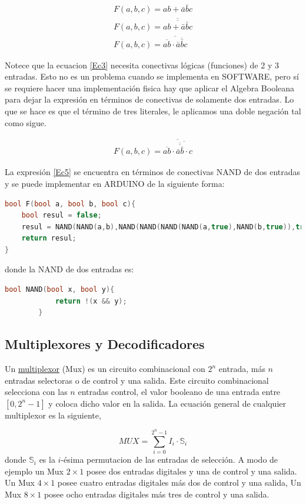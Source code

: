 \begin{eqnarray}
\label{Ec2}
F(a,b,c)=ab+\bar{a}\bar{b}c \\
F(a,b,c)=\overline{\overline{ab+\bar{a}\bar{b}c }} \\  \label{Ec3}
F(a,b,c)=\overline{\overline{ab}\cdot\overline{\bar{a}\bar{b}c}}
\end{eqnarray}


Notece que la ecuacion \eqref{Ec3} necesita conectivas lógicas (funciones) de 2 y 3 entradas. Esto no es un problema cuando se implementa en SOFTWARE, pero sí se requiere hacer una implementación fisica hay que aplicar el Algebra Booleana para dejar la expresión en términos de conectivas de solamente dos entradas. Lo que se hace es que el término de tres literales, le aplicamos una doble negación tal como sigue.

\begin{eqnarray}
\label{Ec5}
F(a,b,c)=\overline{\overline{ab}\cdot\overline{\overline{\overline{\bar{a}\bar{b}}}\cdot c}} 
\end{eqnarray}

La expresión \eqref{Ec5} se encuentra en términos de conectivas NAND de dos entradas y se puede implementar en ARDUINO  de la siguiente forma:
{\footnotesize 
\begin{lstlisting}[language=C++]
bool F(bool a, bool b, bool c){
	bool resul = false;
	resul = NAND(NAND(a,b),NAND(NAND(NAND(NAND(a,true),NAND(b,true)),true),c));
	return resul;
}
\end{lstlisting} 
}
donde la NAND de dos entradas es:

		\begin{lstlisting}[language=C++]
		bool NAND(bool x, bool y){
			return !(x && y);
		}
		\end{lstlisting}

\subsection{Multiplexores y Decodificadores}

Un \href{https://es.wikipedia.org/wiki/Multiplexor}{multiplexor} (Mux) es un circuito combinacional con $2^{n}$ entrada, más $n$  entradas selectoras o de control y una salida. Este circuito combinacional selecciona con las $n$ entradas control,  el valor booleano de una entrada entre $\left[ 0,2^{n}-1\right]$ y coloca dicho valor en la salida. La ecuación general de cualquier multiplexor es la siguiente,

\begin{equation}
MUX=\sum_{i=0}^{2^{n}-1} I_{i}\cdot \mathbb{S}_i
\end{equation}
donde $\mathbb{S}_i$  es la $i$-ésima permutacion de las entradas de selección. A modo de ejemplo un Mux $2 \times 1$
 posee dos entradas digitales y una de control y una salida. Un Mux $4 \times 1$ posee cuatro entradas digitales más dos de control y una salida, Un Mux $8 \times 1$ posee ocho entradas digitales más tres de control y una salida.
 
